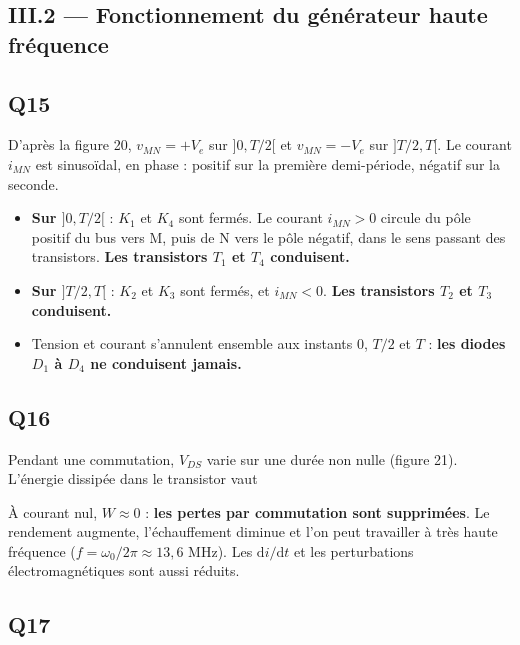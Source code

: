 \documentclass[11pt,a4paper]{article}
\providecommand{\tightlist}{\setlength{\itemsep}{0pt}\setlength{\parskip}{0pt}}
\newcommand{\equationajustee}[1]{%
  \sbox{\boiteequation}{$\displaystyle #1$}%
  \ifdim\wd\boiteequation>\linewidth
    \[\resizebox{\linewidth}{!}{\usebox{\boiteequation}}\]%
  \else
    \[#1\]%
  \fi}
\begin{document}
\hypertarget{iii.2-fonctionnement-du-guxe9nuxe9rateur-haute-fruxe9quence}{%
\subsection{III.2 --- Fonctionnement du générateur haute fréquence}\label{iii.2-fonctionnement-du-guxe9nuxe9rateur-haute-fruxe9quence}}

\hypertarget{q15}{%
\subsection{Q15}\label{q15}}

D'après la figure 20, \(v_{MN}=+V_e\) sur \(]0,T/2[\) et \(v_{MN}=-V_e\) sur \(]T/2,T[\). Le courant \(i_{MN}\) est sinusoïdal, en phase : positif sur la première demi-période, négatif sur la seconde.

\begin{itemize}
\tightlist
\item
  \textbf{Sur \(]0,T/2[\)} : \(K_1\) et \(K_4\) sont fermés. Le courant \(i_{MN}>0\) circule du pôle positif du bus vers M, puis de N vers le pôle négatif, dans le sens passant des transistors. \textbf{Les transistors \(T_1\) et \(T_4\) conduisent.}
\item
  \textbf{Sur \(]T/2,T[\)} : \(K_2\) et \(K_3\) sont fermés, et \(i_{MN}<0\). \textbf{Les transistors \(T_2\) et \(T_3\) conduisent.}
\item
  Tension et courant s'annulent ensemble aux instants \(0\), \(T/2\) et \(T\) : \textbf{les diodes \(D_1\) à \(D_4\) ne conduisent jamais.}
\end{itemize}

\hypertarget{q16}{%
\subsection{Q16}\label{q16}}

Pendant une commutation, \(V_{DS}\) varie sur une durée non nulle (figure 21). L'énergie dissipée dans le transistor vaut

\equationajustee{W=\int v_{DS}\,i\,\mathrm dt}

À courant nul, \(W\approx0\) : \textbf{les pertes par commutation sont supprimées}. Le rendement augmente, l'échauffement diminue et l'on peut travailler à très haute fréquence (\(f=\omega_0/2\pi\approx13{,}6\) MHz). Les \(\mathrm di/\mathrm dt\) et les perturbations électromagnétiques sont aussi réduits.

\hypertarget{q17}{%
\subsection{Q17}\label{q17}}
\end{document}
